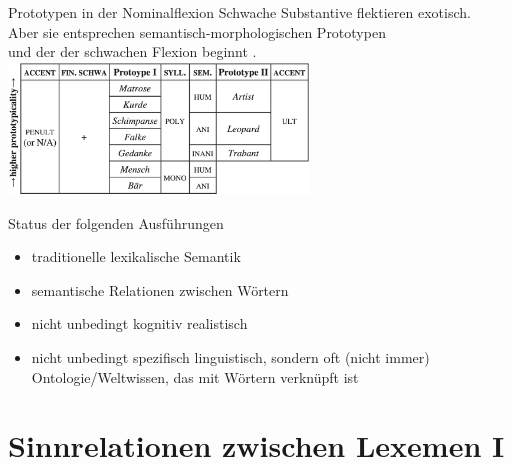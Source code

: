 \begin{frame}
  {Prototypen in der Nominalflexion}
  \onslide<+->
  \onslide<+->
  \alert{Schwache Substantive} flektieren exotisch.\\
  \onslide<+->
  \Viertelzeile
  Aber sie entsprechen semantisch-morphologischen Prototypen\\
  \onslide<+->
  und der  der schwachen Flexion beginnt .\\
  \Zeile
  \onslide<+->
  \centering 
  \includegraphics[width=0.6\textwidth]{graphics/weaknouns}\\
\end{frame}

\begin{frame}
  {Status der folgenden Ausführungen}
  \onslide<+->
  \begin{itemize}[<+->]
    \item traditionelle \alert{lexikalische Semantik}
    \item \alert{semantische Relationen} zwischen Wörtern
      \Zeile
    \item nicht unbedingt kognitiv realistisch\\
      \Zeile
    \item nicht unbedingt spezifisch linguistisch, sondern oft (nicht immer)\\
      Ontologie\slash Weltwissen, das mit Wörtern verknüpft ist\\
  \end{itemize}
\end{frame}


\section[Sinnrelationen I]{Sinnrelationen zwischen Lexemen I}


